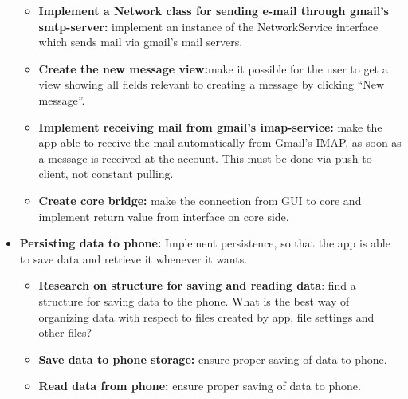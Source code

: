 \begin{itemize}
\begin{itemize}
\item{}\textbf{Implement a Network class for sending e-mail through gmail’s smtp-server:} implement an instance of the NetworkService interface which sends mail via gmail’s mail servers.
\item{}\textbf{Create the new message view:}make it possible for the user to get a view showing all fields relevant to creating a message by clicking “New message”.
\item{}\textbf{Implement receiving mail from gmail’s imap-service:} make the app able to receive the mail automatically from Gmail’s IMAP, as soon as a message is received at the account. This must be done via push to client, not constant pulling.
\item{}\textbf{Create core bridge:} make the connection from GUI to core and implement return value from interface on core side.
\end{itemize}
\item{}\textbf{Persisting data to phone:} Implement persistence, so that the app is able to save data and retrieve it whenever it wants.
\begin{itemize}
\item{}\textbf{Research on structure for saving and reading data}: find a structure for saving data to the phone. What is the best way of organizing data with respect to files created by app, file settings and other files?
\item{}\textbf{Save data to phone storage:} ensure proper saving of data to phone.
\item{}\textbf{Read data from phone:} ensure proper saving of data to phone.
\end{itemize}
\end{itemize}